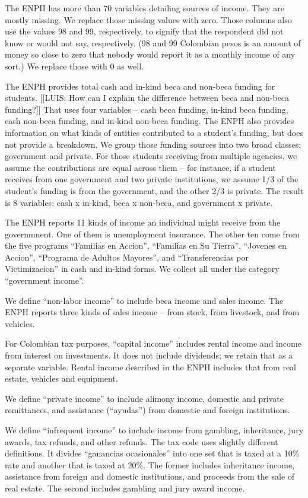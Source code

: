 \documentclass[12pt]{article}
\begin{document}
\begin{appendices}
The ENPH has more than 70 variables detailing sources of income.
They are mostly missing.
We replace those missing values with zero.
Those columns also use the values 98 and 99, respectively,
to signify that the respondent did not know or would not say, respectively.
(98 and 99 Colombian pesos is an amount of money so close to zero
that nobody would report it as a monthly income of any sort.)
We replace those with 0 as well.

The ENPH provides total cash and in-kind beca and non-beca funding for students.
[[LUIS: How can I explain the difference between beca and non-beca funding?]]
That uses four variables --
cash beca funding, in-kind beca funding, cash non-beca funding, and in-kind non-beca funding.
The ENPH also provides information on
what kinds of entities contributed to a student's funding,
but does not provide a breakdown.
We group those funding sources into two broad classes: government and private.
For those students receiving from multiple agencies,
we assume the contributions are equal across them -- for instance,
if a student receives from one government and two private institutions,
we assume 1/3 of the student's funding is from the government,
and the other 2/3 is private.
The result is 8 variables:
cash x in-kind, beca x non-beca, and government x private.

The ENPH reports 11 kinds of income
an individual might receive from the governmnent.
One of them is unemployment insurance.
The other ten come from the five programs
``Familias en Accion'',
``Familias en Su Tierra'',
``Jovenes en Accion'',
``Programa de Adultos Mayores'', and
``Transferencias por Victimizacion''
in cash and in-kind forms.
We collect all under the category ``government income''.

We define ``non-labor income'' to include beca income and sales income.
The ENPH reports three kinds of sales income --
from stock, from livestock, and from vehicles.

For Colombian tax purposes, ``capital income''
includes rental income and income from interest on investments.
It does not include dividends; we retain that as a separate variable.
Rental income described in the ENPH includes that from
real estate, vehicles and equipment.

We define ``private income'' to include
alimony income, domestic and private remittances, and
assistance (``ayudas'') from domestic and foreign institutions.

We define ``infrequent income'' to include income from
gambling, inheritance, jury awards, tax refunds, and other refunds.
The tax code uses slightly different definitions.
It divides ``ganancias ocasionales'' into
one set that is taxed at a 10\% rate
and another that is taxed at 20\%.
The former includes inheritance income,
assistance from foreign and domestic institutions,
and proceeds from the sale of real estate.
The second includes gambling and jury award income.


\end{appendices}
\end{document}
